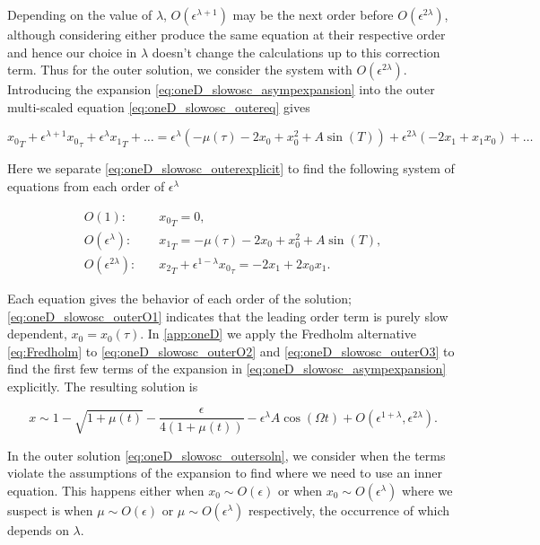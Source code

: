 Depending on the value of $\lambda$, $O(\epsilon^{\lambda+1})$ may be the next order before $O(\epsilon^{2\lambda})$, although considering either produce the same equation at their respective order and hence our choice in $\lambda$ doesn't change the calculations up to this correction term. Thus for the outer solution, we consider the system with $O(\epsilon^{2\lambda})$. Introducing the expansion \eqref{eq:oneD_slowosc_asympexpansion} into the outer multi-scaled equation \eqref{eq:oneD_slowosc_outereq} gives 

\begin{equation}\label{eq:oneD_slowosc_outerexplicit}
{x_0}_T+\epsilon^{\lambda+1}{x_0}_\tau+\epsilon^\lambda {x_1}_T+\ldots=\epsilon^\lambda(-\mu(\tau)-2x_0+x_0^2+A\sin(T))+\epsilon^{2\lambda}(-2x_1+x_1x_0)+\ldots
\end{equation}

Here we separate \eqref{eq:oneD_slowosc_outerexplicit} to find the following system of equations from each order of $\epsilon^\lambda$

\begin{align}
\label{eq:oneD_slowosc_outerO1}
O(1):\quad & {x_0}_T=0, \\
\label{eq:oneD_slowosc_outerO2}
O(\epsilon^\lambda):\quad&  {x_1}_T=-\mu(\tau)-2x_0+x_0^2+A\sin(T),\\
\label{eq:oneD_slowosc_outerO3}
O(\epsilon^{2\lambda}):\quad& {x_2}_T+\epsilon^{1-\lambda}{x_0}_\tau= -2x_1+2x_0x_1.
\end{align}

Each equation gives the behavior of each order of the solution; \eqref{eq:oneD_slowosc_outerO1} indicates that the leading order term is purely slow dependent, $x_0=x_0(\tau)$. In \autoref{app:oneD} we apply the Fredholm alternative \eqref{eq:Fredholm} to \eqref{eq:oneD_slowosc_outerO2} and \eqref{eq:oneD_slowosc_outerO3} to find the first few terms of the expansion in \eqref{eq:oneD_slowosc_asympexpansion} explicitly. The resulting solution is

\begin{equation}\label{eq:oneD_slowosc_outersoln}
x\sim 1-\sqrt{1+\mu(t)}-\frac{\epsilon}{4(1+\mu(t))}-\epsilon^\lambda A \cos(\Omega t)+O(\epsilon^{1+\lambda},\epsilon^{2\lambda}).
\end{equation}

In the outer solution \eqref{eq:oneD_slowosc_outersoln}, we consider when the terms violate the assumptions of the expansion to find where we need to use an inner equation. This happens either when $x_0\sim O(\epsilon)$ or when $x_0\sim O(\epsilon^\lambda)$ where we suspect is when $\mu\sim O(\epsilon)$ or $\mu\sim O(\epsilon^\lambda)$ respectively, the occurrence of which depends on $\lambda$. 

